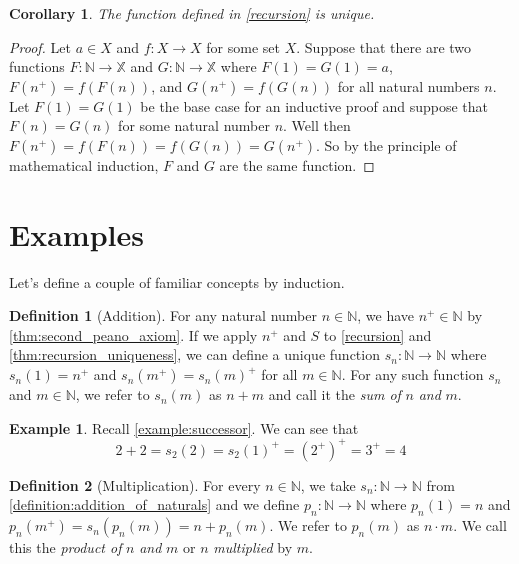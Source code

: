 \documentclass{article}
\theoremstyle{definition}
\newtheorem{definition}{Definition}[section]
\theoremstyle{definition}
\newtheorem{example}{Example}[section]
\theoremstyle{plain}
\theoremstyle{remark}
\theoremstyle{plain}
\theoremstyle{remark}
\theoremstyle{plain}
\theoremstyle{plain}
\theoremstyle{plain}
\newtheorem{corollary}{Corollary}[section]
\begin{document}
\begin{corollary}
  The function defined in \autoref{recursion} is unique.
  \label{thm:recursion_uniqueness}
\end{corollary}

\begin{proof}
  Let \( a \in X \) and \( f: X \rightarrow X \) for some set \( X \). Suppose 
  that there are two functions 
  \( F: \mathbb{N} \rightarrow \mathbb{X}  \) and 
  \( G: \mathbb{N} \rightarrow \mathbb{X} \) where \( F(1) = G(1) = a \), 
  \( F(n^{+}) = f(F(n)) \), and \( G(n^+) = f(G(n)) \) for all natural 
  numbers \( n \). Let \( F(1) = G(1) \) be the base case for an inductive 
  proof and suppose that \( F(n) = G(n) \) for some natural number \( n \). 
  Well then \( F(n^{+}) = f(F(n)) = f(G(n)) = G(n^{+}) \). So by the principle 
  of mathematical induction, \( F \) and \( G \) are the same function.
\end{proof}

\section{Examples}

Let's define a couple of familiar concepts by induction.

\begin{definition}[Addition]
  For any natural number \( n \in \mathbb{N}\), we have 
  \( n^{+} \in \mathbb{N}\) by \autoref{thm:second_peano_axiom}. If we apply 
  \( n^{+} \) and \( S \) to \autoref{recursion} and 
  \autoref{thm:recursion_uniqueness}, we can define a unique function 
  \( s_n : \mathbb{N} \rightarrow \mathbb{N} \) where
  \( s_n(1) = n^{+} \) and \(s_n(m^{+}) = s_n(m)^{+}\) for all 
  \( m \in \mathbb{N} \). For any such function \( s_n \) and 
  \( m \in \mathbb{N} \), we refer to \( s_n(m) \) as \( n + m \) and call it 
  the \textit{sum of} \( n \) \textit{and} \( m \). 
  \label{definition:addition_of_naturals}
\end{definition}

\begin{example}
  Recall \autoref{example:successor}. We can see that 
  \[ 2 + 2 = s_2(2) = s_2(1)^{+} = (2^{+})^{+} = 3^{+} = 4 \]
  \label{example:two_plus_two}
\end{example}

\begin{definition}[Multiplication]
  For every \( n \in \mathbb{N} \), we take 
  \(s_n: \mathbb{N} \rightarrow \mathbb{N} \) from 
  \autoref{definition:addition_of_naturals} and we define 
  \( p_n: \mathbb{N} \rightarrow \mathbb{N} \) where 
  \( p_n(1) = n \) and \\ \( p_n(m^{+}) = s_n(p_n(m)) = n + p_n(m) \). 
  We refer to \( p_n(m) \) as \( n \cdot m \). We call 
  this the \textit{product of} \( n \) \textit{and} \(m\) or \( n \) 
  \textit{multiplied} by \( m \). 
\end{definition}
\end{document}
